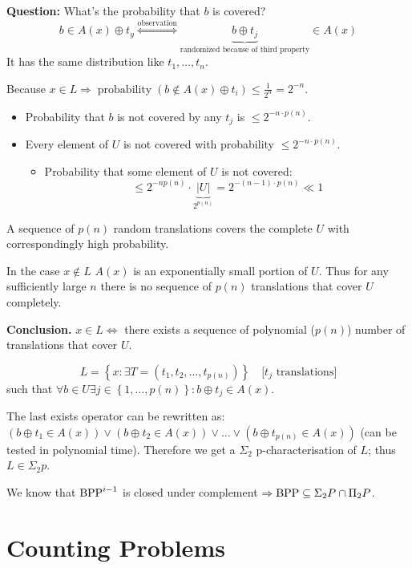 \documentclass[a4paper]{article}
\newcommand{\cls}[1]{\rm{#1}}
\newcommand{\card}[1]{|#1|}
\newcommand{\set}[1]{\left\{#1\right\}}
\DeclareMathOperator{\prop}{probability}
\begin{document}
\textbf{Question:}
  What's the probability that $b$ is covered?
\[
    b \in A(x) \oplus t_y
    \stackrel{\text{observation}}{\Leftrightarrow}
    \underbrace{b \oplus t_j}_{\text{randomized because of third property}} \in A(x)
\]
It has the same distribution like $t_1, \ldots, t_n$.

Because $x \in L \Rightarrow \prop(b \notin A(x) \oplus t_i)
\leq \frac{1}{2^n} = 2^{-n}$.
\begin{itemize}
  \item Probability that $b$ is not covered by any $t_j$ is $\leq 2^{-n \cdot p(n)}$.
  \item Every element of $U$ is not covered with probability $\leq 2^{-n \cdot p(n)}$.
  \begin{itemize}
    \item Probability that some element of $U$ is not covered:
    \[
      \leq 2^{-np(n)} \cdot \underbrace{\card{U}}_{2^{p(n)}} = 2^{-(n-1)\cdot p(n)} \ll 1
    \]
  \end{itemize}
\end{itemize}

A sequence of $p(n)$ random translations covers the complete $U$ with correspondingly high
probability.

In the case $x \notin L$ $A(x)$ is an exponentially small portion of $U$.
Thus for any sufficiently large $n$ there is no sequence of $p(n)$ translations
that cover $U$ completely.

\textbf{Conclusion.} $x \in L \Leftrightarrow $ there exists a sequence of polynomial
($p(n)$) number of translations that cover $U$.

\[
    L = \set{ x : \exists T = (t_1, t_2, \ldots, t_{p(n)})}
        \quad \text{[$t_j$ translations]}
\]
such that $\forall b \in U \exists j \in \set{1, \ldots, p(n)}: b \oplus t_j \in A(x)$.

The last exists operator can be rewritten as: $(b \oplus t_1 \in A(x)) \lor
(b \oplus t_2 \in A(x)) \lor \ldots \lor (b \oplus t_{p(n)} \in A(x))$
(can be tested in polynomial time).
Therefore we get a $\Sigma_2$ p-characterisation of $L$; thus $L \in \Sigma_2 p$.

We know that $\text{\cls{BPP}}^{i-1}$ is closed under complement
$\Rightarrow \text{\cls{BPP}} \subseteq \Sigma_2 P \cap \Pi_2 P$.

\section{Counting Problems}
\end{document}
